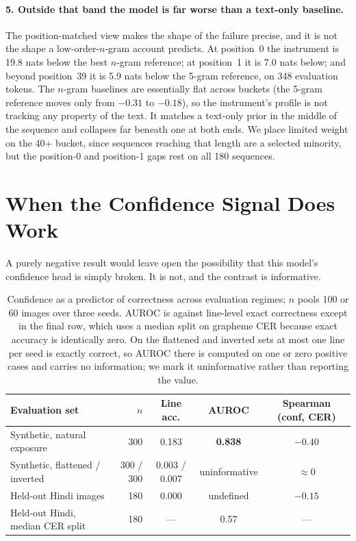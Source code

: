 \documentclass{article}
\begin{document}
\paragraph{5. Outside that band the model is far worse than a text-only baseline.} The
position-matched view makes the shape of the failure precise, and it is not the shape a
low-order-$n$-gram account predicts. At position~0 the instrument is 19.8 nats below the best
$n$-gram reference; at position~1 it is 7.0 nats below; and beyond position~39 it is 5.9 nats
below the 5-gram reference, on 348 evaluation tokens. The $n$-gram baselines are
essentially flat across buckets (the 5-gram reference moves only from $-0.31$ to $-0.18$), so
the instrument's profile is not tracking any property of the text. It matches a text-only prior
in the middle of the sequence and collapses far beneath one at both ends. We place limited
weight on the 40+ bucket, since sequences reaching that length are a selected minority, but the
position-0 and position-1 gaps rest on all 180 sequences.

\section{When the Confidence Signal Does Work}
\label{sec:works}

A purely negative result would leave open the possibility that this model's confidence head is
simply broken. It is not, and the contrast is informative.

\begin{table}[h]
\small
\centering
\caption{Confidence as a predictor of correctness across evaluation regimes; $n$ pools 100 or 60
images over three seeds. AUROC is against line-level exact correctness except in the final row,
which uses a median split on grapheme CER because exact accuracy is identically zero. On the
flattened and inverted sets at most one line per seed is exactly correct, so AUROC there is
computed on one or zero positive cases and carries no information; we mark it uninformative
rather than reporting the value.}
\label{tab:auroc}
\setlength{\tabcolsep}{4pt}
\begin{tabular}{lrccc}
\toprule
Evaluation set & $n$ & Line acc. & AUROC & Spearman (conf, CER) \\
\midrule
Synthetic, natural exposure        & 300 & 0.183 & \textbf{0.838} & $-0.40$ \\
Synthetic, flattened / inverted    & 300 / 300 & 0.003 / 0.007 & uninformative & $\approx 0$ \\
Held-out Hindi images              & 180 & 0.000 & undefined & $-0.15$ \\
Held-out Hindi, median CER split   & 180 & ---   & 0.57 & --- \\
\bottomrule
\end{tabular}
\end{table}
\end{document}
